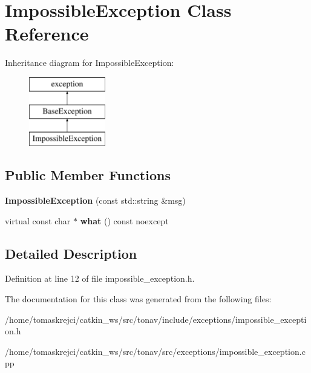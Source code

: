 \hypertarget{class_impossible_exception}{\section{Impossible\-Exception Class Reference}
\label{class_impossible_exception}
}
Inheritance diagram for Impossible\-Exception\-:\begin{figure}[H]
\begin{center}
\leavevmode
\includegraphics[height=3.000000cm]{class_impossible_exception}
\end{center}
\end{figure}
\subsection*{Public Member Functions}
\begin{DoxyCompactItemize}
\item 
\hypertarget{class_impossible_exception_a88afecc506123920b1bcd8f8b1bc612d}{{\bfseries Impossible\-Exception} (const std\-::string \&msg)}\label{class_impossible_exception_a88afecc506123920b1bcd8f8b1bc612d}

\item 
\hypertarget{class_impossible_exception_a3368d553e27e69451266f56bc37e9a86}{virtual const char $\ast$ {\bfseries what} () const noexcept}\label{class_impossible_exception_a3368d553e27e69451266f56bc37e9a86}

\end{DoxyCompactItemize}


\subsection{Detailed Description}


Definition at line 12 of file impossible\-\_\-exception.\-h.



The documentation for this class was generated from the following files\-:\begin{DoxyCompactItemize}
\item 
/home/tomaskrejci/catkin\-\_\-ws/src/tonav/include/exceptions/impossible\-\_\-exception.\-h\item 
/home/tomaskrejci/catkin\-\_\-ws/src/tonav/src/exceptions/impossible\-\_\-exception.\-cpp\end{DoxyCompactItemize}
